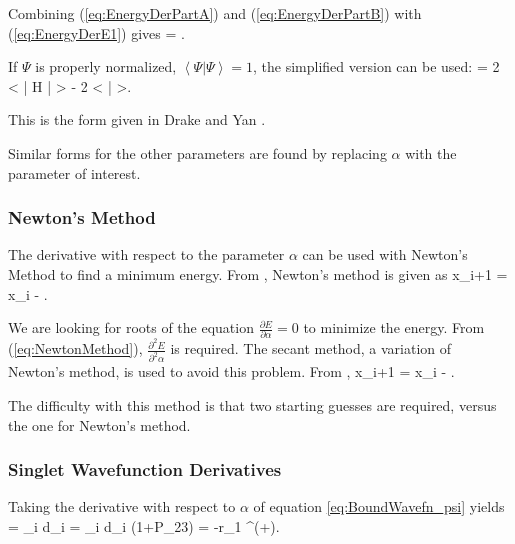 \documentclass[Dissertation.tex]{subfiles}
\begin{document}
Combining (\ref{eq:EnergyDerPartA}) and (\ref{eq:EnergyDerPartB}) with (\ref{eq:EnergyDerE1}) gives
\beq
{} = .
\label{eq:EnergyDerivative}
\eeq

\noindent If $\Psi$ is properly normalized, $\left< \Psi \Big| \Psi \right> = 1$, the simplified version can be used:
\beq
{} = 2 \left< \Psi \Big| H \Big| \frac{\partial\Psi}{\partial \alpha} \right> - 2 \left< \Psi \Big| \frac{\partial\Psi}{\partial \alpha} \right>.
\label{eq:EnergyDerivativeNorm}
\eeq

\noindent This is the form given in Drake and Yan \cite{Yan1995}.

Similar forms for the other parameters are found by replacing $\alpha$ with the parameter of interest.


\subsubsection{Newton's Method}
The derivative with respect to the parameter $\alpha$ can be used with Newton's Method to find a minimum energy.  From \cite{Sauer2006a}, Newton's method is given as
\beq
x_{i+1} = x_i - .
\label{eq:NewtonMethod}
\eeq

We are looking for roots of the equation $\displaystyle\frac{\partial E}{\partial \alpha} = 0$ to minimize the energy.  From (\ref{eq:NewtonMethod}), $\displaystyle\frac{\partial^2 E}{\partial^2 \alpha}$ is required.  The secant method, a variation of Newton's method, is used to avoid this problem.  From \cite{Sauer2006a},
\beq
x_{i+1} = x_i - .
\eeq

\noindent The difficulty with this method is that two starting guesses are required, versus the one for Newton's method.


\subsubsection{Singlet Wavefunction Derivatives}
Taking the derivative with respect to $\alpha$ of equation \ref{eq:BoundWavefn_psi} yields
\beq
\frac{\partial \Psi^+}{\partial \alpha} = \sum_i d_i  = \sum_i d_i (1+P_{23})  = -r_1 \Psi^{(+)}.
\label{eq:PsiDerAlpha}
\eeq
\end{document}
